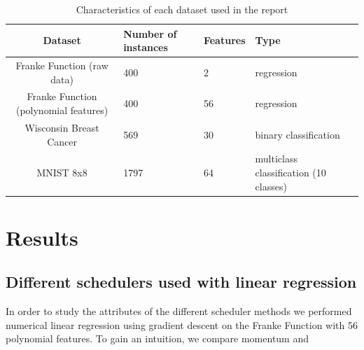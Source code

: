 \documentclass[onecolumn,10pt,cleanfoot]{asme2ej}
\begin{document}
\begin{table}[h]
\caption{Characteristics of each dataset used in the report}
\begin{center}
\label{datasettable}
\begin{tabular}{| c | l | l | l |}
\hline
Dataset & Number of instances & Features & Type \\
\hline
Franke Function (raw data) & 400 & 2 & regression \\
Franke Function (polynomial features) & 400 & 56 & regression \\
Wisconsin Breast Cancer & 569 & 30 & binary classification \\
MNIST 8x8 & 1797 & 64 & multiclass classification (10 classes) \\
\hline
\end{tabular}
\end{center}
\end{table}

\section{Results}

\subsection{Different schedulers used with linear regression}

In order to study the attributes of the different scheduler methods we performed numerical linear regression using gradient descent on the Franke Function with 56 polynomial features. To gain an intuition, we compare momentum and 

\end{document}
